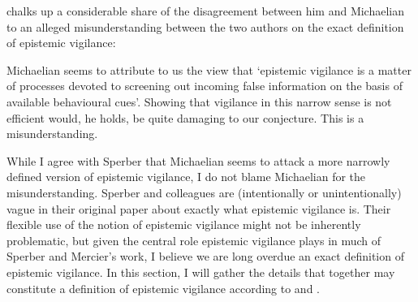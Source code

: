 \citet{Sperber13} chalks up a considerable share of the disagreement between him and Michaelian to an alleged misunderstanding between the two authors on the exact definition of epistemic vigilance:
\begin{quoting}
    Michaelian seems to attribute to us the view that ‘epistemic vigilance is a matter of processes devoted to screening out incoming false information on the basis of available behavioural cues’. Showing that vigilance in this narrow sense is not efficient would, he holds, be quite damaging to our conjecture. This is a misunderstanding.
    \hfill \citep[p.~65]{Sperber13}
\end{quoting}
While I agree with Sperber that Michaelian seems to attack a more narrowly defined version of epistemic vigilance, I do not blame Michaelian for the misunderstanding. Sperber and colleagues are (intentionally or unintentionally) vague in their original paper about exactly what epistemic vigilance is.
Their flexible use of the notion of epistemic vigilance might not be inherently problematic, but given the central role epistemic vigilance plays in much of Sperber and Mercier's work, I believe we are long overdue an exact definition of epistemic vigilance. In this section, I will gather the details that together may constitute a definition of epistemic vigilance according to \citet{Sperber10} and \citet{Sperber13}.

